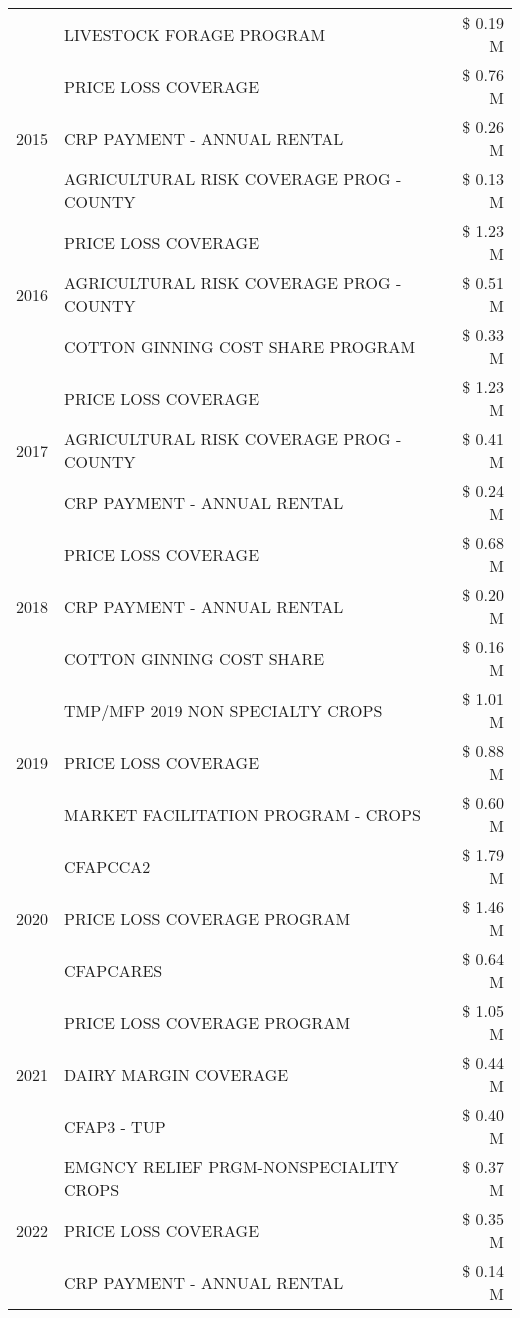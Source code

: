 \begin{tabular}{llr}
 & LIVESTOCK FORAGE PROGRAM & \$ 0.19 M \\
\cline{1-3}
\multirow[t]{3}{*}{2015} & PRICE LOSS COVERAGE & \$ 0.76 M \\
 & CRP PAYMENT - ANNUAL RENTAL & \$ 0.26 M \\
 & AGRICULTURAL RISK COVERAGE PROG - COUNTY & \$ 0.13 M \\
\cline{1-3}
\multirow[t]{3}{*}{2016} & PRICE LOSS COVERAGE & \$ 1.23 M \\
 & AGRICULTURAL RISK COVERAGE PROG - COUNTY & \$ 0.51 M \\
 & COTTON GINNING COST SHARE PROGRAM & \$ 0.33 M \\
\cline{1-3}
\multirow[t]{3}{*}{2017} & PRICE LOSS COVERAGE & \$ 1.23 M \\
 & AGRICULTURAL RISK COVERAGE PROG - COUNTY & \$ 0.41 M \\
 & CRP PAYMENT - ANNUAL RENTAL & \$ 0.24 M \\
\cline{1-3}
\multirow[t]{3}{*}{2018} & PRICE LOSS COVERAGE & \$ 0.68 M \\
 & CRP PAYMENT - ANNUAL RENTAL & \$ 0.20 M \\
 & COTTON GINNING COST SHARE & \$ 0.16 M \\
\cline{1-3}
\multirow[t]{3}{*}{2019} & TMP/MFP 2019 NON SPECIALTY CROPS & \$ 1.01 M \\
 & PRICE LOSS COVERAGE & \$ 0.88 M \\
 & MARKET FACILITATION PROGRAM - CROPS & \$ 0.60 M \\
\cline{1-3}
\multirow[t]{3}{*}{2020} & CFAPCCA2 & \$ 1.79 M \\
 & PRICE LOSS COVERAGE PROGRAM & \$ 1.46 M \\
 & CFAPCARES & \$ 0.64 M \\
\cline{1-3}
\multirow[t]{3}{*}{2021} & PRICE LOSS COVERAGE PROGRAM & \$ 1.05 M \\
 & DAIRY MARGIN COVERAGE & \$ 0.44 M \\
 & CFAP3 - TUP & \$ 0.40 M \\
\cline{1-3}
\multirow[t]{3}{*}{2022} & EMGNCY RELIEF PRGM-NONSPECIALITY CROPS & \$ 0.37 M \\
 & PRICE LOSS COVERAGE & \$ 0.35 M \\
 & CRP PAYMENT - ANNUAL RENTAL & \$ 0.14 M \\
\cline{1-3}
\bottomrule
\end{tabular}
